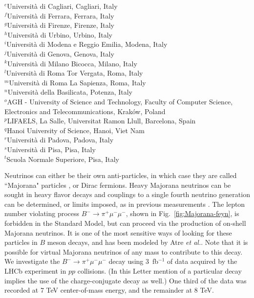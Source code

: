 \documentclass[12pt,a4paper]{article}
\def\to                 {\ensuremath{\rightarrow}\xspace}
\newcommand{\etal}{{\slshape et al.\/}\xspace}
\begin{document}
\begin{flushleft}
{$ ^{e}$Universit\`{a} di Cagliari, Cagliari, Italy\\
$ ^{f}$Universit\`{a} di Ferrara, Ferrara, Italy\\
$ ^{g}$Universit\`{a} di Firenze, Firenze, Italy\\
$ ^{h}$Universit\`{a} di Urbino, Urbino, Italy\\
$ ^{i}$Universit\`{a} di Modena e Reggio Emilia, Modena, Italy\\
$ ^{j}$Universit\`{a} di Genova, Genova, Italy\\
$ ^{k}$Universit\`{a} di Milano Bicocca, Milano, Italy\\
$ ^{l}$Universit\`{a} di Roma Tor Vergata, Roma, Italy\\
$ ^{m}$Universit\`{a} di Roma La Sapienza, Roma, Italy\\
$ ^{n}$Universit\`{a} della Basilicata, Potenza, Italy\\
$ ^{o}$AGH - University of Science and Technology, Faculty of Computer Science, Electronics and Telecommunications, Krak\'{o}w, Poland\\
$ ^{p}$LIFAELS, La Salle, Universitat Ramon Llull, Barcelona, Spain\\
$ ^{q}$Hanoi University of Science, Hanoi, Viet Nam\\
$ ^{r}$Universit\`{a} di Padova, Padova, Italy\\
$ ^{s}$Universit\`{a} di Pisa, Pisa, Italy\\
$ ^{t}$Scuola Normale Superiore, Pisa, Italy\\
}
\end{flushleft}
 
\cleardoublepage


\renewcommand{\thefootnote}{\arabic{footnote}}
\setcounter{footnote}{0}






\pagestyle{plain} \setcounter{page}{1}
  \noindent 

Neutrinos can either be their own anti-particles, in which case they are called ``Majorana" particles \cite{Majorana}, or Dirac fermions.  Heavy Majorana neutrinos can be sought in heavy flavor decays and couplings to a single fourth neutrino generation can be determined, or limits imposed, as in previous measurements \cite{Aaij:2012zr,*Aaij:2011ex,Lees:2013pxa,*Seon:2011ni,*Weir:1989sq}. The lepton number violating process $B^-\to\pi^+\mu^-\mu^-$, shown in Fig.~\ref{fig:Majorana-feyn}, is forbidden in the Standard Model, but  can proceed via the production of on-shell Majorana neutrinos. It is one of the most sensitive ways of looking for these particles in $B$ meson decays, and has been modeled by Atre \etal \cite{Atre:2009rg}.  Note that it is possible for virtual Majorana neutrinos of any mass to contribute to this decay.   We investigate the $B^-\to\pi^+\mu^-\mu^-$ decay using 3~fb$^{-1}$ of data acquired by the LHCb experiment in $pp$ collisions. (In this Letter mention of a particular decay implies the use of the charge-conjugate decay as well.) One third of the data was recorded at 7 TeV center-of-mass energy, and the remainder at 8 TeV.  
\end{document}
